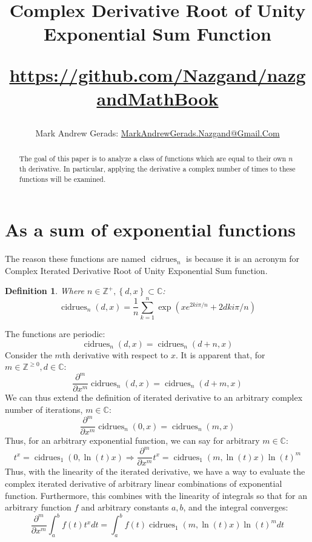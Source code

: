 \documentclass[]{article}
\author{Mark Andrew Gerads: \href{MailTo:MarkAndrewGerads.Nazgand@Gmail.Com}{MarkAndrewGerads.Nazgand@Gmail.Com}}
\title{
	Complex Derivative Root of Unity Exponential Sum Function
	
	\href{https://github.com/Nazgand/nazgandMathBook}{https://github.com/Nazgand/nazgandMathBook}
}
\DeclareMathOperator{\cidrues}{cidrues}
\newcommand{\pqty}[1]{{\left(#1\right)}}
\newcommand{\Bqty}[1]{{\left\{#1\right\}}}
\newcommand{\pdiff}[2]{\frac{\partial^{#2}}{\partial #1^{#2}}}
\newtheorem{definition}[theorem]{Definition}
\numberwithin{equation}{section}
\begin{document}
	
	\maketitle
	
	\begin{abstract}
		The goal of this paper is to analyze a class of functions which are equal to their own \(n\)th derivative. In particular, applying the derivative a complex number of times to these functions will be examined.
	\end{abstract}
	
	\section{As a sum of exponential functions}
	The reason these functions are named $\cidrues_n$ is because it is an acronym for Complex Iterated Derivative Root of Unity Exponential Sum function.
	\begin{definition}
		Where $n\in\mathbb{Z}^+,\Bqty{d,x}\subset\mathbb{C}$:
		\begin{equation}
		\label{cidrues Exponential sum form}
		\cidrues_n\pqty{d,x}=
		\frac{1}{n}\sum _{k=1}^n \exp\pqty{xe^{2ki\pi/n}+2dki\pi/n}
		\end{equation}
	\end{definition}
	The functions are periodic:
	\begin{equation}
	\cidrues_n\pqty{d,x}=\cidrues_n\pqty{d+n,x}
	\end{equation}
	Consider the $m$th derivative with respect to $x$. It is apparent that, for $m\in\mathbb{Z}^{\geq 0},d\in\mathbb{C}$:
	\begin{equation}
	\pdiff{x}{m}\cidrues_n\pqty{d,x}=\cidrues_n\pqty{d+m,x}
	\end{equation}
	We can thus extend the definition of iterated derivative to an arbitrary complex number of iterations, $m\in\mathbb{C}$:
	\begin{equation}
	\pdiff{x}{m}\cidrues_n\pqty{0,x}=\cidrues_n\pqty{m,x}
	\end{equation}
	Thus, for an arbitrary exponential function, we can say for arbitrary $m\in\mathbb{C}$:
	\begin{equation}
	t^x=\cidrues_1\pqty{0,\ln\pqty{t}x}
	\Rightarrow
	\pdiff{x}{m}t^x=\cidrues_1\pqty{m,\ln\pqty{t}x}\ln\pqty{t}^m
	\end{equation}
	Thus, with the linearity of the iterated derivative, we have a way to evaluate the complex iterated derivative of arbitrary linear combinations of exponential function. Furthermore, this combines with the linearity of integrals so that for an arbitrary function $f$ and arbitrary constants $a,b$, and the integral converges:
	\begin{equation}
		\pdiff{x}{m}\int_{a}^{b}f\pqty{t}t^x dt = \int_{a}^{b}f\pqty{t}\cidrues_1\pqty{m,\ln\pqty{t}x}\ln\pqty{t}^m dt
	\end{equation}
	
\end{document}
